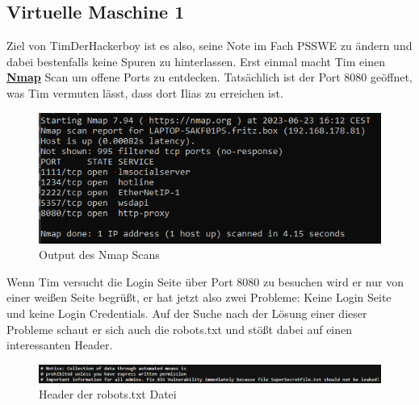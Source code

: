 \documentclass[10pt, a4paper,onecolumn ,titlepage]{article}
\begin{document}
    \subsection{Virtuelle Maschine 1}
    \label{subsec:virtuelle-maschine-1}
    Ziel von TimDerHackerboy ist es also, seine Note im Fach PSSWE zu ändern und dabei bestenfalls keine Spuren zu hinterlassen. Erst einmal macht Tim einen \href{https://github.com/nmap/nmap}{\textbf{Nmap}} Scan
    um offene Ports zu entdecken. Tatsächlich ist der Port 8080 geöffnet, was Tim vermuten lässt, dass dort Ilias zu erreichen ist.
    \begin{figure}[H]
        \centering
        \includegraphics[width=1\textwidth]{VM1_Bilder/NmapScan.PNG}
        \caption{Output des Nmap Scans}
        \label{fig:NmapScan}
    \end{figure}
    \noindent
    Wenn Tim versucht die Login Seite über Port 8080 zu besuchen wird er nur von einer weißen Seite begrüßt,
    er hat jetzt also zwei Probleme: Keine Login Seite und keine Login Credentials.
    Auf der Suche nach der Lösung einer dieser Probleme schaut er sich auch die robots.txt und stößt dabei auf einen interessanten Header.

    \begin{figure}[H]
        \centering
        \includegraphics[width=1\textwidth]{VM1_Bilder/robotstxt.PNG}
        \caption{Header der robots.txt Datei }
        \label{fig:robotsTxt}
    \end{figure}
\end{document}
